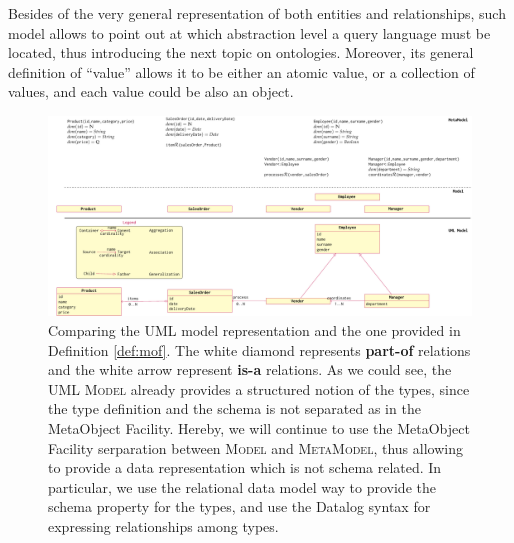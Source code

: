 Besides of the very general representation of both entities and relationships, such model   allows to point out at which abstraction level a query language must be located, thus introducing the next topic on ontologies. Moreover, its general definition of ``value'' allows it to be either an atomic value, or a collection of values, and each value could be also an object.

 \begin{figure}
	\centering
	\includegraphics[width=\textheight]{fig/01dataint/umlmodelling2}
	\caption{Comparing the UML model representation and the one provided in Definition \ref{def:mof}. The white diamond represents \textbf{part-of} relations and the white arrow represent  \textbf{is-a} relations. As we could see, the UML \textsc{Model} already provides a structured notion of the types, since the type definition and the schema is not separated as in the MetaObject Facility. Hereby, we will continue to use the MetaObject Facility serparation between \textsc{Model} and \textsc{MetaModel}, thus allowing to provide a data representation which is not schema related. In particular, we use the relational data model way to provide the schema property for the types, and use the Datalog syntax for expressing relationships among types.}
	\label{fig:umlmodelling2}
\end{figure}

